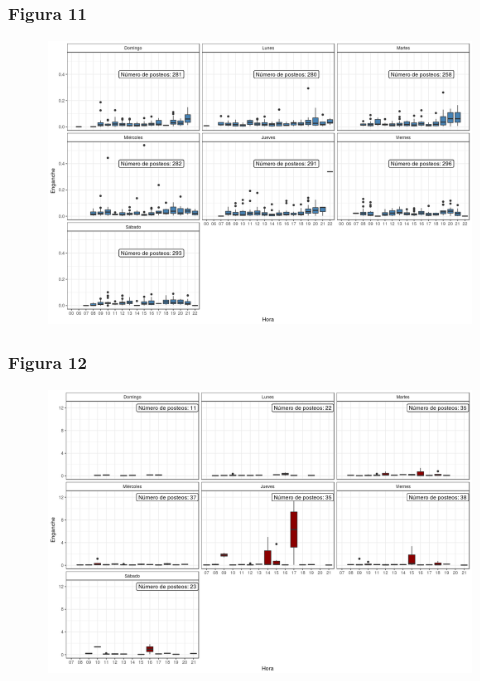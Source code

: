\documentclass[a4paper,10pt]{article}
\begin{document}
\subsubsection{Figura 11}
\begin{figure}[H]
  \begin{center}
   \includegraphics[width=.85\textwidth]{imagenes/engancheSeat}
      \captionsetup{width=.80\textwidth}
   \caption{\centering } 
  \end{center} 
\end{figure}


\subsubsection{Figura 12}
\begin{figure}[H]
  \begin{center}
   \includegraphics[width=.85\textwidth]{imagenes/engancheVwfs}
      \captionsetup{width=.80\textwidth}
   \caption{\centering } 
  \end{center} 
\end{figure}
\end{document}
